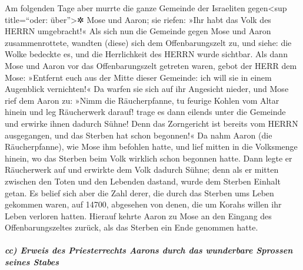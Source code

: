 Am folgenden Tage aber murrte die ganze Gemeinde der
Israeliten gegen\textless sup title=``oder: über''\textgreater✲ Mose und
Aaron; sie riefen: »Ihr habt das Volk des HERRN umgebracht!«
Als sich nun die Gemeinde gegen Mose und Aaron
zusammenrottete, wandten (diese) sich dem Offenbarungszelt zu, und
siehe: die Wolke bedeckte es, und die Herrlichkeit des HERRN wurde
sichtbar. Als dann Mose und Aaron vor das Offenbarungszelt
getreten waren, gebot der HERR dem Mose:
»Entfernt euch aus der Mitte dieser Gemeinde: ich will
sie in einem Augenblick vernichten!« Da warfen sie sich auf ihr
Angesicht nieder, und Mose rief dem Aaron zu: »Nimm die
Räucherpfanne, tu feurige Kohlen vom Altar hinein und leg Räucherwerk
darauf! trage es dann eilends unter die Gemeinde und erwirke ihnen
dadurch Sühne! Denn das Zorngericht ist bereits vom HERRN ausgegangen,
und das Sterben hat schon begonnen!« Da nahm Aaron (die
Räucherpfanne), wie Mose ihm befohlen hatte, und lief mitten in die
Volksmenge hinein, wo das Sterben beim Volk wirklich schon begonnen
hatte. Dann legte er Räucherwerk auf und erwirkte dem Volk dadurch
Sühne; denn als er mitten zwischen den Toten und den
Lebenden dastand, wurde dem Sterben Einhalt getan. Es
belief sich aber die Zahl derer, die durch das Sterben ums Leben
gekommen waren, auf 14700, abgesehen von denen, die um Korahs willen ihr
Leben verloren hatten. Hierauf kehrte Aaron zu Mose an
den Eingang des Offenbarungszeltes zurück, als das Sterben ein Ende
genommen hatte.

\hypertarget{cc-erweis-des-priesterrechts-aarons-durch-das-wunderbare-sprossen-seines-stabes}{%
\subparagraph{cc) Erweis des Priesterrechts Aarons durch das wunderbare
Sprossen seines
Stabes}\label{cc-erweis-des-priesterrechts-aarons-durch-das-wunderbare-sprossen-seines-stabes}}

